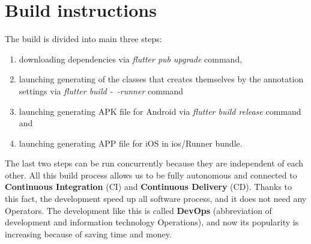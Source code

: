 \section{Build instructions}\label{sec:build-instructions}
The build is divided into main three steps:
\begin{enumerate}
    \item downloading dependencies via \textit{flutter pub upgrade} command,
    \item launching generating of the classes that creates themselves by the annotation settings via \textit{flutter build -~-runner} command
    \item launching generating APK file for Android via \textit{flutter build release} command and
    \item launching generating APP file for iOS in ios/Runner bundle.
\end{enumerate}
The last two steps can be run concurrently because they are independent of each other.
All this build process allows us to be fully autonomous and connected to \textbf{Continuous Integration} (CI) and \textbf{Continuous Delivery} (CD).
Thanks to this fact, the development speed up all software process, and it does not need any Operators.
The development like this is called \textbf{DevOps} (abbreviation of development and information technology Operations), and now its popularity is increasing because of saving time and money.

